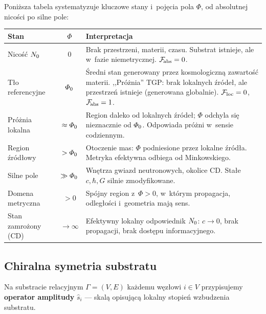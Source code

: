 \begin{remark}\label{rem:tablica-stanow}
Poni\.zsza tabela systematyzuje kluczowe stany i~poj\k{e}cia
pola $\Phi$, od absolutnej nico\'sci po silne pole:

\begin{center}
\small
\begin{tabular}{@{}>{\raggedright}p{2.5cm}cp{10cm}@{}}
\toprule
\textbf{Stan} & $\Phi$ & \textbf{Interpretacja} \\
\midrule
Nico\'s\'c $N_0$ & $0$
  & Brak przestrzeni, materii, czasu. Substrat istnieje,
    ale w~fazie niemetrycznej. $\mathcal{F}_{\!\mathrm{abs}} = 0$. \\[4pt]
T\l{}o referencyjne & $\varPhi_0$
  & \'Sredni stan generowany przez kosmologiczn\k{a} zawarto\'s\'c
    materii. ,,Pr\'o\.znia'' TGP: brak lokalnych \'zr\'ode\l{}, ale
    przestrze\'n istnieje (generowana globalnie).
    $\mathcal{F}_{\mathrm{loc}} = 0$, $\mathcal{F}_{\!\mathrm{abs}} = 1$. \\[4pt]
Pr\'o\.znia lokalna & $\approx \varPhi_0$
  & Region daleko od lokalnych \'zr\'ode\l{};
    $\Phi$ odchyla si\k{e} nieznacznie od $\varPhi_0$.
    Odpowiada pr\'o\.zni w~sensie codziennym. \\[4pt]
Region \'zr\'od\l{}owy & $> \varPhi_0$
  & Otoczenie mas: $\Phi$ podniesione przez lokalne \'zr\'od\l{}a.
    Metryka efektywna odbiega od Minkowskiego. \\[4pt]
Silne pole & $\gg \varPhi_0$
  & Wn\k{e}trza gwiazd neutronowych, okolice CD.
    Sta\l{}e $c, \hbar, G$ silnie zmodyfikowane. \\[4pt]
Domena metryczna & $> 0$
  & Sp\'ojny region z~$\Phi > 0$, w~kt\'orym propagacja,
    odleg\l{}o\'sci i~geometria maj\k{a} sens. \\[4pt]
Stan zamro\.zony (CD) & $\to\infty$
  & Efektywny lokalny odpowiednik $N_0$:
    $c \to 0$, brak propagacji, brak dost\k{e}pu
    informacyjnego. \\
\bottomrule
\end{tabular}
\end{center}
\end{remark}

\subsection{Chiralna symetria substratu}\label{ssec:chiralna}\label{ax:symmetry}

Na substracie relacyjnym $\Gamma = (V, E)$ ka\.zdemu
w\k{e}z\l{}owi $i \in V$ przypisujemy \textbf{operator
amplitudy} $\hat{s}_i$ --- skal\k{a} opisuj\k{a}c\k{a}
lokalny stopie\'n wzbudzenia substratu.


